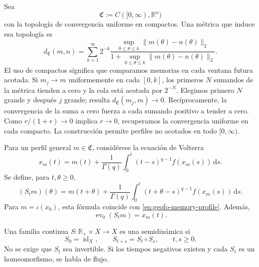 Sea
\begin{equation}
 \mathfrak C:=C([0,\infty),\mathbb R^n)
 \label{eq:geofo-history-space}
\end{equation}
con la topología de convergencia uniforme en compactos. Una métrica que induce
esa topología es
\begin{equation}
 d_{\mathfrak C}(m,n)=
 \sum_{k=1}^{\infty}2^{-k}
 \frac{\displaystyle\sup_{0\leq\theta\leq k}
 \|m(\theta)-n(\theta)\|_2}
 {1+\displaystyle\sup_{0\leq\theta\leq k}
 \|m(\theta)-n(\theta)\|_2}.
 \label{eq:geofo-compact-open-metric}
\end{equation}
El uso de compactos significa que comparamos memorias en cada ventana
futura acotada. Si \(m_j\to m\) uniformemente en cada \([0,k]\), los
primeros \(N\) sumandos de la métrica tienden a cero y la cola está acotada
por \(2^{-N}\). Elegimos primero \(N\) grande y después \(j\) grande;
resulta \(d_{\mathfrak C}(m_j,m)\to0\). Recíprocamente, la convergencia
de la suma a cero fuerza a cada sumando positivo a tender a cero. Como
\(r/(1+r)\to0\) implica \(r\to0\), recuperamos la convergencia uniforme
en cada compacto. La construcción permite perfiles no acotados en todo
\([0,\infty)\).

Para un perfil general \(m\in\mathfrak C\), considérese la ecuación de Volterra
\begin{equation}
 x_m(t)=m(t)+\frac1{\Gamma(q)}
 \int_0^t(t-s)^{q-1}f(x_m(s))\,\mathrm ds.
 \label{eq:geofo-general-volterra}
\end{equation}
Se define, para \(t,\theta\geq0\),
\begin{equation}
 (S_tm)(\theta)=m(t+\theta)+\frac1{\Gamma(q)}
 \int_0^t(t+\theta-s)^{q-1}f(x_m(s))\,\mathrm ds.
 \label{eq:geofo-semiflow-operator}
\end{equation}
Para \(m=\iota(x_0)\), esta fórmula coincide con
\cref{eq:geofo-memory-profile}. Además,
\begin{equation}
 \operatorname{ev}_0(S_tm)=x_m(t).
 \label{eq:geofo-evaluation-semiflow}
\end{equation}

\begin{definition}
Una familia continua \(S:\mathbb R_+\times X\to X\) es una semidinámica si
\begin{equation}
 S_0=\operatorname{id}_X,
 \qquad S_{t+s}=S_t\circ S_s,
 \qquad t,s\geq0.
 \label{eq:geofo-semiflow-law}
\end{equation}
No se exige que \(S_t\) sea invertible. Si los tiempos negativos existen y
cada \(S_t\) es un homeomorfismo, se habla de flujo.
\end{definition}

